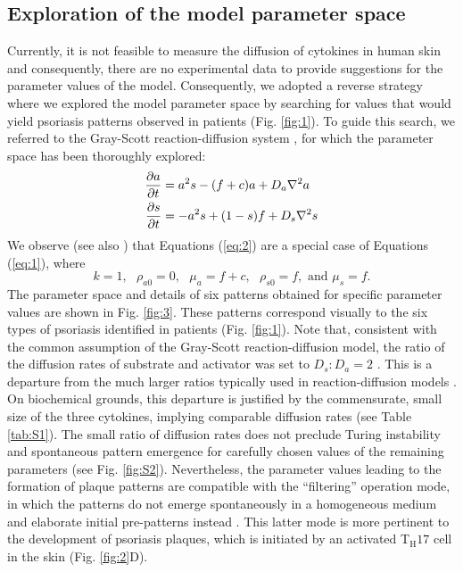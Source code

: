 \subsection{Exploration of the model parameter space}
Currently, it is not feasible to measure the diffusion of cytokines in human skin and consequently, there are no experimental data to provide suggestions for the parameter values of the model. Consequently, we adopted a reverse strategy where we explored the model parameter space by searching for values that would yield psoriasis patterns observed in patients (Fig. \ref{fig:1}). To guide this search, we referred to the Gray-Scott reaction-diffusion system \citep{gray1984}, for which the parameter space has been thoroughly explored:
\begin{equation}
	\begin{aligned} \label{eq:2}
	\frac{\partial a}{\partial t} &= a^2s-(f+c)a+ D_a \nabla^2 a \\
	\frac{\partial s}{\partial t} &= -a^2s+(1-s)f + D_s \nabla^2 s
	\end{aligned}
\end{equation}
We observe (see also \citep{yamamoto2010, yamamoto2011}) that Equations (\ref{eq:2}) are a special case of Equations (\ref{eq:1}), where
\[ k=1,\text{   }\rho_{a0}=0,\text{   }\mu_a=f+c,\text{   }\rho_{s0}=f,\text{ and }\mu_s=f.\]
The parameter space and details of six patterns obtained for specific parameter values are shown in Fig. \ref{fig:3}. These patterns correspond visually to the six types of psoriasis identified in patients (Fig. \ref{fig:1}). Note that, consistent with the common assumption of the Gray-Scott reaction-diffusion model, the ratio of the diffusion rates of substrate and activator was set to $D_s:D_a=2$ \citep{pearson1993}. This is a departure from the much larger ratios typically used in reaction-diffusion models \citep{diego2018, gierer1972, kondo2010, lengyel1991, marcon2016, vastano1987}. On biochemical grounds, this departure is justified by the commensurate, small size of the three cytokines, implying comparable diffusion rates (see Table \ref{tab:S1}). The small ratio of diffusion rates does not preclude Turing instability and spontaneous pattern emergence for carefully chosen values of the remaining parameters (see Fig. \ref{fig:S2}). Nevertheless, the  parameter values leading to the formation of plaque patterns are compatible with the ``filtering” operation mode, in which the patterns do not emerge spontaneously in a homogeneous medium and elaborate initial pre-patterns instead \citep{diego2018, lee1993, muratov2000, pearson1993}. This latter mode is more pertinent to the development of psoriasis plaques, which is initiated by an activated T$_{\text{H}}17$ cell in the skin (Fig. \ref{fig:2}D).

